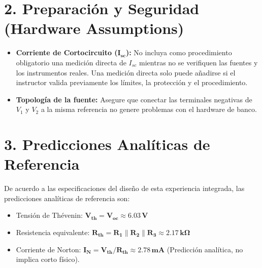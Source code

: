 \documentclass[11pt, a4paper]{article}
\begin{document}
\section*{2. Preparación y Seguridad (Hardware Assumptions)}
\begin{itemize}\setlength\itemsep{-0.1em}
    \item \textbf{Corriente de Cortocircuito ($\bm{I_{sc}}$):} No incluya como procedimiento obligatorio una medición directa de $I_{sc}$ mientras no se verifiquen las fuentes y los instrumentos reales. Una medición directa solo puede añadirse si el instructor valida previamente los límites, la protección y el procedimiento.
    \item \textbf{Topología de la fuente:} Asegure que conectar las terminales negativas de $V_1$ y $V_2$ a la misma referencia no genere problemas con el hardware de banco.
\end{itemize}

\section*{3. Predicciones Analíticas de Referencia}
De acuerdo a las especificaciones del diseño de esta experiencia integrada, las predicciones analíticas de referencia son:
\begin{itemize}
    \item Tensión de Thévenin: $\bm{V_{th} = V_{oc} \approx 6.03\,\text{V}}$
    \item Resistencia equivalente: $\bm{R_{th} = R_1 \parallel R_2 \parallel R_3 \approx 2.17\,\text{k}\Omega}$
    \item Corriente de Norton: $\bm{I_N = V_{th}/R_{th} \approx 2.78\,\text{mA}}$ (Predicción analítica, no implica corto físico).
\end{itemize}
\end{document}
